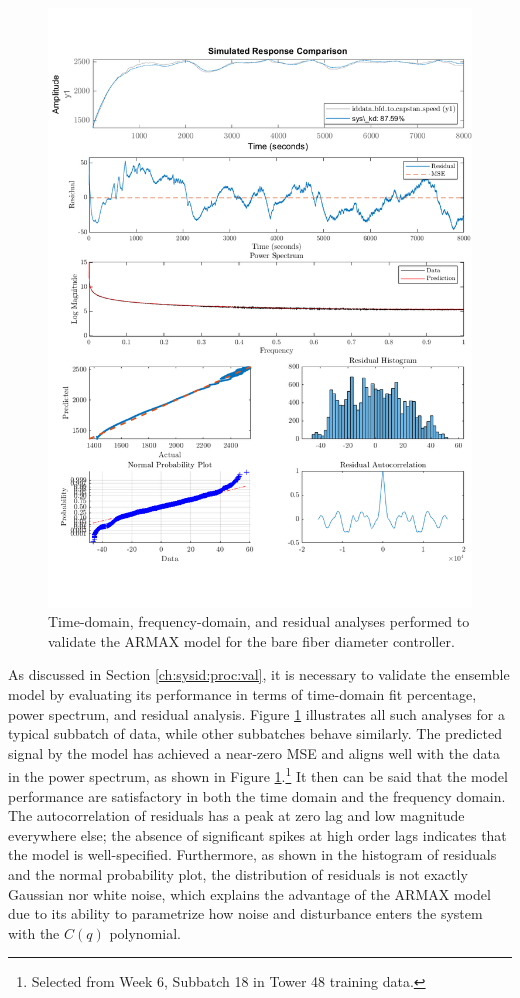 \begin{figure}[p]
    \centering
    \includegraphics[width=\textwidth]{figures/sysid_validate.png}
    \caption{Time-domain, frequency-domain, and residual analyses performed to validate the ARMAX model for the bare fiber diameter controller.}
    \label{fig:sysid_validate}
\end{figure}

As discussed in Section \ref{ch:sysid:proc:val}, it is necessary to validate the ensemble model by evaluating its performance in terms of time-domain fit percentage, power spectrum, and residual analysis. Figure \ref{fig:sysid_validate} illustrates all such analyses for a typical subbatch of data, while other subbatches behave similarly. The predicted signal by the model has achieved a near-zero MSE and aligns well with the data in the power spectrum, as shown in Figure \ref{fig:sysid_validate}.\footnote{Selected from Week 6, Subbatch 18 in Tower 48 training data.} It then can be said that the model performance are satisfactory in both the time domain and the frequency domain. The autocorrelation of residuals has a peak at zero lag and low magnitude everywhere else; the absence of significant spikes at high order lags indicates that the model is well-specified. Furthermore, as shown in the histogram of residuals and the normal probability plot, the distribution of residuals is not exactly Gaussian nor white noise, which explains the advantage of the ARMAX model due to its ability to parametrize how noise and disturbance enters the system with the $C(q)$ polynomial. 


